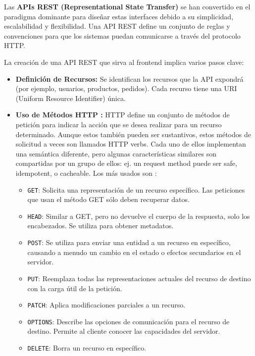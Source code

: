 Las \textbf{APIs REST (Representational State Transfer)} se han convertido en el paradigma dominante para dise\~{n}ar estas interfaces debido a su simplicidad, escalabilidad y flexibilidad. Una API REST define un conjunto de reglas y convenciones para que los sistemas puedan comunicarse a trav\'{e}s del protocolo HTTP.

La creaci\'{o}n de una API REST que sirva al frontend implica varios pasos clave:

\begin{itemize}
    \item \textbf{Definici\'{o}n de Recursos:} Se identifican los recursos que la API expondr\'{a} (por ejemplo, usuarios, productos, pedidos). Cada recurso tiene una URI (Uniform Resource Identifier) \'{u}nica.
    \item \textbf{Uso de M\'{e}todos HTTP \cite{MDNHTTPMethods2025}:} HTTP define un conjunto de métodos de petición para indicar la acción que se desea realizar para un recurso determinado. Aunque estos también pueden ser sustantivos, estos métodos de solicitud a veces son llamados HTTP verbs. Cada uno de ellos implementan una semántica diferente, pero algunas características similares son compartidas por un grupo de ellos: ej. un request method puede ser safe, idempotent, o cacheable.
    \newline\newline
    Los más usados son :
    \begin{itemize}
        \item \texttt{GET}: Solicita una representación de un recurso específico. Las peticiones que usan el método GET sólo deben recuperar datos.
        \item \texttt{HEAD}: Similar a GET, pero no devuelve el cuerpo de la respuesta, solo los encabezados. Se utiliza para obtener metadatos.
        \item \texttt{POST}: Se utiliza para enviar una entidad a un recurso en específico, causando a menudo un cambio en el estado o efectos secundarios en el servidor.
        \item \texttt{PUT}: Reemplaza todas las representaciones actuales del recurso de destino con la carga útil de la petición.
        \item \texttt{PATCH}: Aplica modificaciones parciales a un recurso.
        \item \texttt{OPTIONS}: Describe las opciones de comunicación para el recurso de destino. Permite al cliente conocer las capacidades del servidor.
        \item \texttt{DELETE}: Borra un recurso en específico.

\end{itemize}
\end{itemize}
